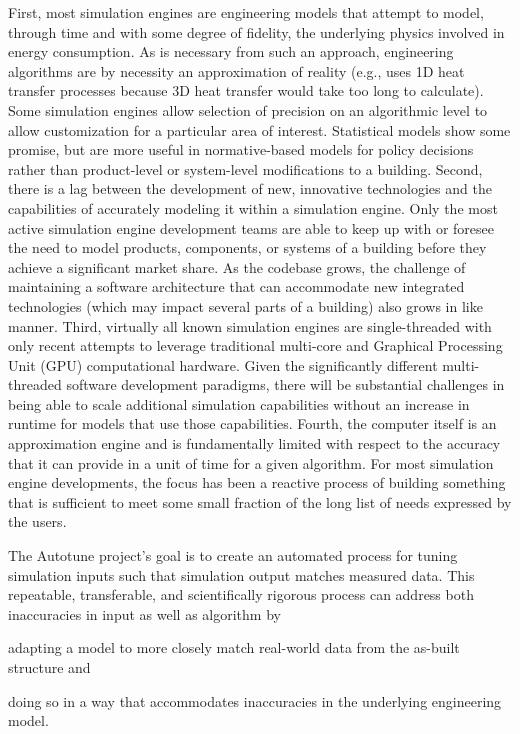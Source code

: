 \documentclass[preprint, review, 12pt]{elsarticle}
\begin{document}
First, most simulation engines are engineering models that attempt to model, through time and with some degree of fidelity, the underlying physics involved in energy consumption. As is necessary from such an approach, engineering algorithms are by necessity an approximation of reality (e.g., uses 1D heat transfer processes because 3D heat transfer would take too long to calculate). Some simulation engines allow selection of precision on an algorithmic level to allow customization for a particular area of interest. Statistical models show some promise, but are more useful in normative-based models for policy decisions rather than product-level or system-level modifications to a building. Second, there is a lag between the development of new, innovative technologies and the capabilities of accurately modeling it within a simulation engine. Only the most active simulation engine development teams are able to keep up with or foresee the need to model products, components, or systems of a building before they achieve a significant market share. As the codebase grows, the challenge of maintaining a software architecture that can accommodate new integrated technologies (which may impact several parts of a building) also grows in like manner. Third, virtually all known simulation engines are single-threaded with only recent attempts to leverage traditional multi-core and Graphical Processing Unit (GPU) computational hardware. Given the significantly different multi-threaded software development paradigms, there will be substantial challenges in being able to scale additional simulation capabilities without an increase in runtime for models that use those capabilities. Fourth, the computer itself is an approximation engine and is fundamentally limited with respect to the accuracy that it can provide in a unit of time for a given algorithm. For most simulation engine developments, the focus has been a reactive process of building something that is sufficient to meet some small fraction of the long list of needs expressed by the users.

The Autotune project's \cite{cit:new2012} goal is to create an automated process for tuning simulation inputs such that simulation output matches measured data. This repeatable, transferable, and scientifically rigorous process can address both inaccuracies in input as well as algorithm by 
\begin{inparaenum}[1)]
\item adapting a model to more closely match real-world data from the as-built structure and 
\item doing so in a way that accommodates inaccuracies in the underlying engineering
model.
\end{inparaenum}
\end{document}
